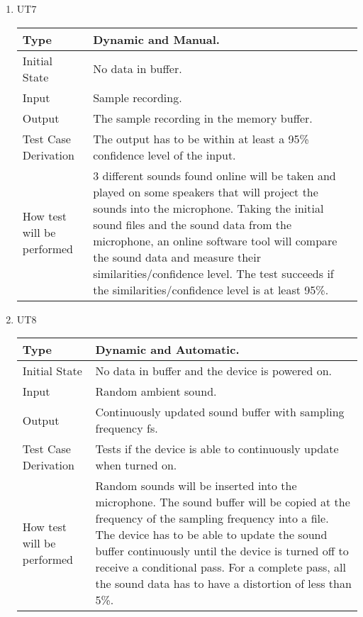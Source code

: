 \documentclass[12pt, titlepage]{article}
\begin{document}
\begin{enumerate}

\item{UT7\\}

\begin{tabular}{ |p{5cm}||p{7cm}| }
    \hline
    Type & Dynamic and Manual. \\
    \hline
    Initial State  &  No data in buffer. \\
    \hline
    Input &   Sample recording. \\
    \hline
    Output &   The sample recording in the memory buffer.  \\
    \hline
    Test Case Derivation &   The output has to be within at least a 95\% confidence level of the input. \\
    \hline
    How test will be performed & 3 different sounds found online will be taken and played on some speakers that will project the sounds into the microphone. Taking the initial sound files and the sound data from the microphone, an online software tool will compare the sound data and measure their similarities/confidence level. The test succeeds if the similarities/confidence level is at least 95\%. \\
    \hline
\end{tabular}

\item{UT8\\}

\begin{tabular}{ |p{5cm}||p{7cm}| }
    \hline
    Type & Dynamic and Automatic. \\
    \hline
    Initial State  &  No data in buffer and the device is powered on. \\
    \hline
    Input &   Random ambient sound. \\
    \hline
    Output &   Continuously updated sound buffer with sampling frequency fs.  \\
    \hline
    Test Case Derivation &   Tests if the device is able to continuously update when turned on. \\
    \hline
    How test will be performed & Random sounds will be inserted into the microphone. The sound buffer will be copied at the frequency of the sampling frequency into a file. The device has to be able to update the sound buffer continuously until the device is turned off to receive a conditional pass. For a complete pass, all the sound data has to have a distortion of less than 5\%. \\
    \hline
\end{tabular}

\end{enumerate}
\end{document}

